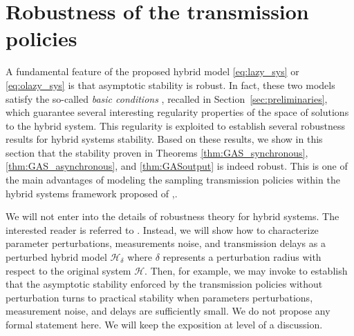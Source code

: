 \documentclass[twocolumn]{autart}
\begin{document}
{

\section{Robustness of the transmission policies}
\label{sec:robustness}

A fundamental feature of the proposed hybrid model \eqref{eq:lazy_sys} or
\eqref{eq:olazy_sys} is that asymptotic stability is robust. 
In fact, these two models satisfy the
so-called \emph{basic conditions} \cite{GoebelCSM09}, recalled in Section~\ref{sec:preliminaries}, which guarantee
several interesting regularity properties of the space of solutions 
to the hybrid system. This regularity is exploited to establish 
several robustness results for hybrid systems stability.
Based on these results, we show in this section that 
the stability proven in Theorems \ref{thm:GAS_synchronous},
\ref{thm:GAS_asynchronous}, and \ref{thm:GASoutput} is indeed robust.
This is one of the main advantages of modeling the sampling transmission
policies within the hybrid systems framework proposed of 
\cite{Goebel06},\cite{GoebelCSM09}.

We will not enter into the details of robustness theory for hybrid systems.
The interested reader is referred to \cite{Goebel12}. 
Instead, we will show how to characterize parameter perturbations, 
measurements noise, and transmission delays
as a perturbed hybrid model $\mathcal{H}_\delta$ where $\delta$ represents a 
perturbation radius with respect to the original system $\mathcal{H}$. 
Then, for example, we may invoke \cite[Theorem 17]{GoebelCSM09} 
to establish that the asymptotic stability enforced by 
the transmission policies without perturbation turns to 
practical stability when parameters perturbations, measurement noise,
and delays are sufficiently small. 
We do not propose any formal statement here. 
We will keep the exposition at level of a discussion.

}
\end{document}
